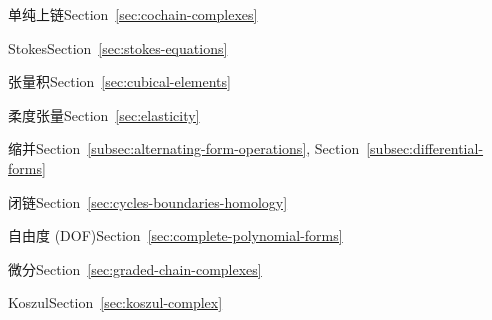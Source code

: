 \par\noindent\hspace*{1em}\label{index:complex-simplicial-cochain}{单纯上链}\quad Section~\ref{sec:cochain-complexes}

\par\noindent\hspace*{1em}\label{index:complex-stokes}{Stokes}\quad Section~\ref{sec:stokes-equations}

\par\noindent\hspace*{1em}\label{index:complex-tensor-product}{张量积}\quad Section~\ref{sec:cubical-elements}

\par\noindent\hspace*{0em}\label{index:compliance-tensor}{柔度张量}\quad Section~\ref{sec:elasticity}

\par\noindent\hspace*{0em}\label{index:contraction}{缩并}\quad Section~\ref{subsec:alternating-form-operations}, Section~\ref{subsec:differential-forms}

\par\noindent\hspace*{0em}\label{index:cycle}{闭链}\quad Section~\ref{sec:cycles-boundaries-homology}

\par\noindent\hspace*{0em}\label{index:degree-of-freedom-dof}{自由度 (DOF)}\quad Section~\ref{sec:complete-polynomial-forms}

\par\noindent\hspace*{0em}\label{index:differential}{微分}\quad Section~\ref{sec:graded-chain-complexes}

\par\noindent\hspace*{1em}\label{index:differential-koszul}{Koszul}\quad Section~\ref{sec:koszul-complex}

